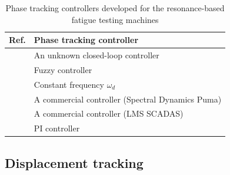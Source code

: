 \documentclass[preprint,12pt]{elsarticle}
\begin{document}
\begin{table}
    \centering
    \begin{tabular}{|l|l|} \hline
     Ref.    &  Phase tracking controller  \\ \hline
    \cite{George_2006}  &  An unknown closed-loop controller \\  \hline
      \cite{Ji_2010}   &  Fuzzy controller  \\ \hline
    \cite{SCHRAMM2024117045,SCHNEIDER2018171,herrmann2018simulation_Thesis}  &  Constant frequency $\omega_d$ \\ \hline
    \cite{Su2014} & A commercial controller (Spectral Dynamics Puma) \\ \hline
    \cite{Dupke2026} & A commercial controller (LMS SCADAS) \\ \hline
    \cite{DORANGA2024115368} & PI controller \\
    \hline
    \end{tabular}
    \vspace{0.1cm}
    \caption{Phase tracking controllers developed for the resonance-based fatigue testing machines}
    \label{T_frequency_seeking}
\end{table}


\subsection{Displacement tracking} \label{S_amplitude_tracking}
\end{document}
